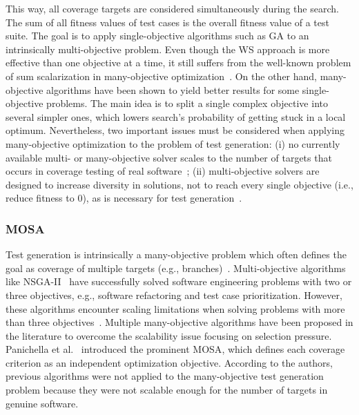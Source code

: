 \documentclass[paper=a4,%
  twoside,%
  BCOR4mm,%
  abstract=true,%
  toc=bibliography,%
  chapterprefix=true,%
  toc=bibliographynumbered,%
  open=right,%
  english,%
  pagesize=pdftex]{scrreprt}
\begin{document}
This way, all coverage targets are considered simultaneously during the search. The sum of all fitness values of test cases is the overall fitness value of a test suite. The goal is to apply single-objective algorithms such as \ac{GA} to an intrinsically multi-objective problem. Even though the \ac{WS} approach is more effective than one objective at a time, it still suffers from the well-known problem of sum scalarization in many-objective optimization~\cite{Deb2014}. On the other hand, many-objective algorithms have been shown to yield better results for some single-objective problems. The main idea is to split a single complex objective into several simpler ones, which lowers search's probability of getting stuck in a local optimum. Nevertheless, two important issues must be considered when applying many-objective optimization to the problem of test generation: (i) no currently available multi- or many-objective solver scales to the number of targets that occurs in coverage testing of real software~\cite{Arcuri_2014}; (ii) multi-objective solvers are designed to increase diversity in solutions, not to reach every single objective (i.e., reduce fitness to 0), as is necessary for test generation~\cite{Panichella2018}.


\subsubsection{MOSA}
Test generation is intrinsically a many-objective problem which often defines the goal as coverage of multiple targets (e.g., branches)~\cite{Panichella2018}. Multi-objective algorithms like \ac{NSGA-II}~\cite{Deb_2000} have successfully solved software engineering problems with two or three objectives, e.g., software refactoring and test case prioritization. However, these algorithms encounter scaling limitations when solving problems with more than three objectives~\cite{Li2015}. Multiple many-objective algorithms have been proposed in the literature to overcome the scalability issue focusing on selection pressure. Panichella et al.~\cite{Panichella_2015} introduced the prominent \ac{MOSA}, which defines each coverage criterion as an independent optimization objective. According to the authors, previous algorithms were not applied to the many-objective test generation problem because they were not scalable enough for the number of targets in genuine software.
\end{document}
